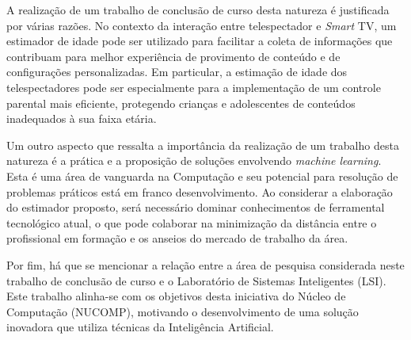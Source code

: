 A realização de um trabalho de conclusão de curso desta natureza é justificada por várias razões. No contexto da interação entre telespectador e \emph{Smart} TV, um estimador de idade pode ser utilizado para facilitar a coleta de informações que contribuam para melhor experiência de provimento de conteúdo e de configurações personalizadas. Em particular, a estimação de idade dos telespectadores pode ser especialmente para a implementação de um controle parental mais eficiente, protegendo crianças e adolescentes de conteúdos inadequados à sua faixa etária.

Um outro aspecto que ressalta a importância da realização de um trabalho desta natureza é a prática e a proposição de soluções envolvendo \emph{machine learning}. Esta é uma área de vanguarda na Computação e seu potencial para resolução de problemas práticos está em franco desenvolvimento. Ao considerar a elaboração do estimador proposto, será necessário dominar conhecimentos de  ferramental tecnológico atual, o que pode colaborar na minimização da distância entre o profissional em formação e os anseios do mercado de trabalho da área.

Por fim, há que se mencionar a relação entre a área de pesquisa considerada neste trabalho de conclusão de curso e o Laboratório de Sistemas Inteligentes (LSI). Este trabalho alinha-se com os objetivos desta iniciativa do Núcleo de Computação (NUCOMP), motivando o desenvolvimento de uma solução  inovadora que utiliza técnicas da Inteligência Artificial.
